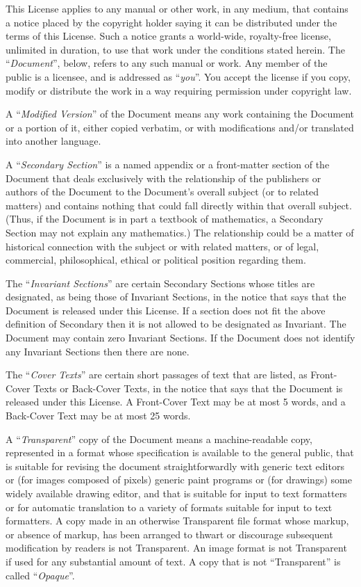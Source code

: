 This License applies to any manual or other work, in any medium, that
contains a notice placed by the copyright holder saying it can be
distributed under the terms of this License.  Such a notice grants a
world-wide, royalty-free license, unlimited in duration, to use that
work under the conditions stated herein.  The ``\textit{Document}'', below,
refers to any such manual or work.  Any member of the public is a
licensee, and is addressed as ``\textit{you}''.  You accept the license if you
copy, modify or distribute the work in a way requiring permission
under copyright law.

A ``\textit{Modified Version}'' of the Document means any work containing the
Document or a portion of it, either copied verbatim, or with
modifications and/or translated into another language.

A ``\textit{Secondary Section}'' is a named appendix or a front-matter section of
the Document that deals exclusively with the relationship of the
publishers or authors of the Document to the Document's overall subject
(or to related matters) and contains nothing that could fall directly
within that overall subject.  (Thus, if the Document is in part a
textbook of mathematics, a Secondary Section may not explain any
mathematics.)  The relationship could be a matter of historical
connection with the subject or with related matters, or of legal,
commercial, philosophical, ethical or political position regarding
them.

The ``\textit{Invariant Sections}'' are certain Secondary Sections whose titles
are designated, as being those of Invariant Sections, in the notice
that says that the Document is released under this License.  If a
section does not fit the above definition of Secondary then it is not
allowed to be designated as Invariant.  The Document may contain zero
Invariant Sections.  If the Document does not identify any Invariant
Sections then there are none.

The ``\textit{Cover Texts}'' are certain short passages of text that are listed,
as Front-Cover Texts or Back-Cover Texts, in the notice that says that
the Document is released under this License.  A Front-Cover Text may
be at most 5 words, and a Back-Cover Text may be at most 25 words.

A ``\textit{Transparent}'' copy of the Document means a machine-readable copy,
represented in a format whose specification is available to the
general public, that is suitable for revising the document
straightforwardly with generic text editors or (for images composed of
pixels) generic paint programs or (for drawings) some widely available
drawing editor, and that is suitable for input to text formatters or
for automatic translation to a variety of formats suitable for input
to text formatters.  A copy made in an otherwise Transparent file
format whose markup, or absence of markup, has been arranged to thwart
or discourage subsequent modification by readers is not Transparent.
An image format is not Transparent if used for any substantial amount
of text.  A copy that is not ``Transparent'' is called ``\textit{Opaque}''.

